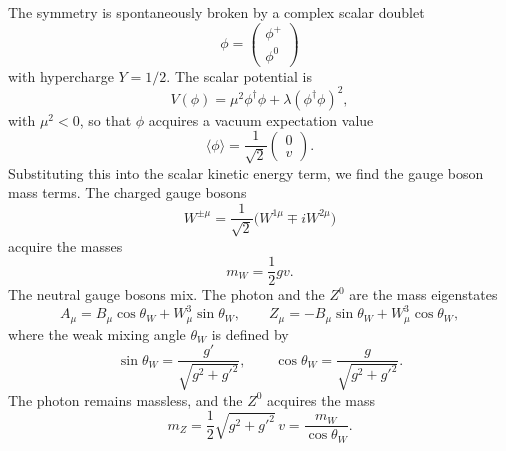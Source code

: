 The symmetry is spontaneously broken by a complex scalar doublet
\begin{equation}
  \phi = \begin{pmatrix}\phi^+\\ \phi^0\end{pmatrix}
\end{equation}
with hypercharge $Y = 1/2$.  The scalar potential is
\begin{equation}
  V(\phi) = \mu^2\phi^{\dagger}\phi + \lambda(\phi^{\dagger}\phi)^2 ,
\end{equation}
with $\mu^2 < 0$, so that $\phi$ acquires a vacuum expectation value
\begin{equation}
  \langle\phi\rangle = \frac{1}{\sqrt{2}}\begin{pmatrix}0\\ v\end{pmatrix} .
  \label{eq:20.58b}
\end{equation}
Substituting this into the scalar kinetic energy term, we find the gauge
boson mass terms.  The charged gauge bosons
\begin{equation}
  W^{\pm\mu} = \frac{1}{\sqrt{2}}\bigl( W^{1\mu} \mp iW^{2\mu} \bigr)
  \label{eq:20.63}
\end{equation}
acquire the masses
\begin{equation}
  m_W = \frac{1}{2}gv .
\end{equation}
The neutral gauge bosons mix.  The photon and the $Z^0$ are the mass
eigenstates
\begin{equation}
  A_\mu = B_\mu\cos\theta_W + W^3_\mu\sin\theta_W,\qquad
  Z_\mu = -B_\mu\sin\theta_W + W^3_\mu\cos\theta_W ,
  \label{eq:20.64}
\end{equation}
where the weak mixing angle $\theta_W$ is defined by
\begin{equation}
  \sin\theta_W = \frac{g'}{\sqrt{g^2+g'^2}},\qquad
  \cos\theta_W = \frac{g}{\sqrt{g^2+g'^2}} .
\end{equation}
The photon remains massless, and the $Z^0$ acquires the mass
\begin{equation}
  m_Z = \frac{1}{2}\sqrt{g^2+g'^2}\,v = \frac{m_W}{\cos\theta_W} .
  \label{eq:20.73}
\end{equation}

